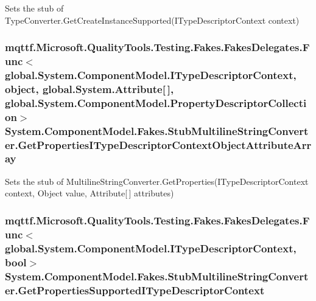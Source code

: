 Sets the stub of Type\-Converter.\-Get\-Create\-Instance\-Supported(\-I\-Type\-Descriptor\-Context context)

\hypertarget{class_system_1_1_component_model_1_1_fakes_1_1_stub_multiline_string_converter_aa8655d2443a3d2f397f20c989398387f}{
\subsubsection[{Get\-Properties\-I\-Type\-Descriptor\-Context\-Object\-Attribute\-Array}]{\setlength{\rightskip}{0pt plus 5cm}mqttf.\-Microsoft.\-Quality\-Tools.\-Testing.\-Fakes.\-Fakes\-Delegates.\-Func$<$global.\-System.\-Component\-Model.\-I\-Type\-Descriptor\-Context, object, global.\-System.\-Attribute\mbox{[}$\,$\mbox{]}, global.\-System.\-Component\-Model.\-Property\-Descriptor\-Collection$>$ System.\-Component\-Model.\-Fakes.\-Stub\-Multiline\-String\-Converter.\-Get\-Properties\-I\-Type\-Descriptor\-Context\-Object\-Attribute\-Array}}\label{class_system_1_1_component_model_1_1_fakes_1_1_stub_multiline_string_converter_aa8655d2443a3d2f397f20c989398387f}


Sets the stub of Multiline\-String\-Converter.\-Get\-Properties(\-I\-Type\-Descriptor\-Context context, Object value, Attribute\mbox{[}$\,$\mbox{]} attributes)

\hypertarget{class_system_1_1_component_model_1_1_fakes_1_1_stub_multiline_string_converter_a3c0a9ce48cad2a768a1b351c53107d9c}{
\subsubsection[{Get\-Properties\-Supported\-I\-Type\-Descriptor\-Context}]{\setlength{\rightskip}{0pt plus 5cm}mqttf.\-Microsoft.\-Quality\-Tools.\-Testing.\-Fakes.\-Fakes\-Delegates.\-Func$<$global.\-System.\-Component\-Model.\-I\-Type\-Descriptor\-Context, bool$>$ System.\-Component\-Model.\-Fakes.\-Stub\-Multiline\-String\-Converter.\-Get\-Properties\-Supported\-I\-Type\-Descriptor\-Context}}\label{class_system_1_1_component_model_1_1_fakes_1_1_stub_multiline_string_converter_a3c0a9ce48cad2a768a1b351c53107d9c}


